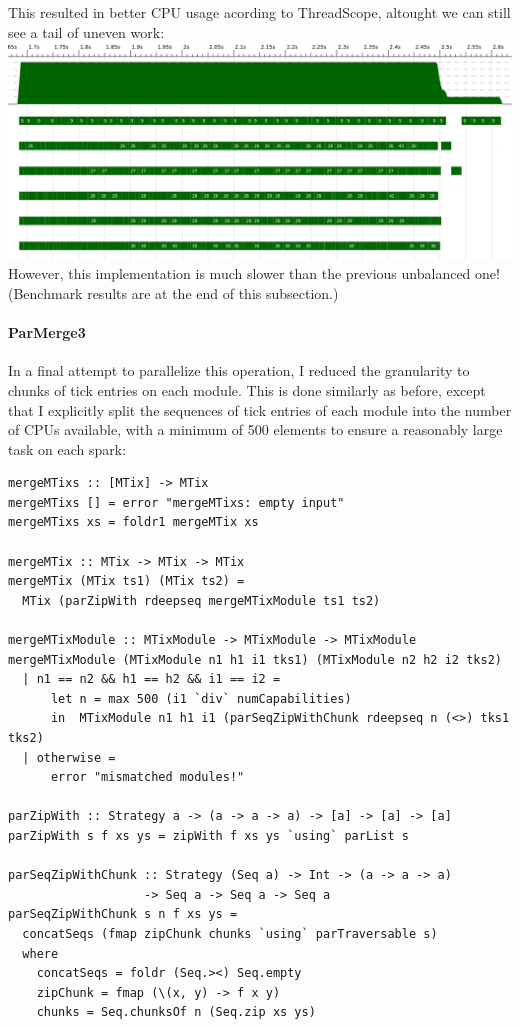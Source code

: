 \documentclass[a4paper,10pt]{article}
\begin{document}
This resulted in better CPU usage acording to ThreadScope, altought we can still
see a tail of uneven work:\\

\includegraphics[scale=0.3]{threadscope/ParMerge2}\\

However, this implementation is much slower than the previous unbalanced one!
(Benchmark results are at the end of this subsection.)

\paragraph{ParMerge3}

In a final attempt to parallelize this operation, I reduced the granularity to
chunks of tick entries on each module.
%
This is done similarly as before, except that I explicitly split the sequences
of tick entries of each module into the number of CPUs available, with a minimum
of 500 elements to ensure a reasonably large task on each spark:

\begin{verbatim}
mergeMTixs :: [MTix] -> MTix
mergeMTixs [] = error "mergeMTixs: empty input"
mergeMTixs xs = foldr1 mergeMTix xs

mergeMTix :: MTix -> MTix -> MTix
mergeMTix (MTix ts1) (MTix ts2) =
  MTix (parZipWith rdeepseq mergeMTixModule ts1 ts2)

mergeMTixModule :: MTixModule -> MTixModule -> MTixModule
mergeMTixModule (MTixModule n1 h1 i1 tks1) (MTixModule n2 h2 i2 tks2)
  | n1 == n2 && h1 == h2 && i1 == i2 =
      let n = max 500 (i1 `div` numCapabilities)
      in  MTixModule n1 h1 i1 (parSeqZipWithChunk rdeepseq n (<>) tks1 tks2)
  | otherwise =
      error "mismatched modules!"

parZipWith :: Strategy a -> (a -> a -> a) -> [a] -> [a] -> [a]
parZipWith s f xs ys = zipWith f xs ys `using` parList s

parSeqZipWithChunk :: Strategy (Seq a) -> Int -> (a -> a -> a)
                   -> Seq a -> Seq a -> Seq a
parSeqZipWithChunk s n f xs ys =
  concatSeqs (fmap zipChunk chunks `using` parTraversable s)
  where
    concatSeqs = foldr (Seq.><) Seq.empty
    zipChunk = fmap (\(x, y) -> f x y)
    chunks = Seq.chunksOf n (Seq.zip xs ys)
\end{verbatim}
\end{document}
